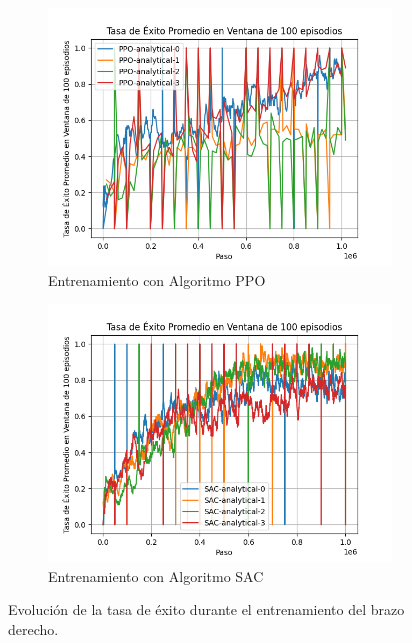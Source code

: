 \begin{figure}[h!]
	\centering
	
	\begin{subfigure}[b]{0.48\textwidth}
		\centering
		\includegraphics[width=\textwidth]{images/graphs/PPO/Right/success_rate}
		\caption{Entrenamiento con Algoritmo PPO}
		\label{fig:train-ppo-succ-right}
	\end{subfigure}
	\hfill
	\begin{subfigure}[b]{0.48\textwidth}
		\centering
		\includegraphics[width=\textwidth]{images/graphs/SAC/Right/success_rate}
		\caption{Entrenamiento con Algoritmo SAC}
		\label{fig:train-sac-succ-right}
	\end{subfigure}
	
	\caption{Evolución de la tasa de éxito durante el entrenamiento del brazo derecho.}
	\label{fig:train-succ-right}
\end{figure}

